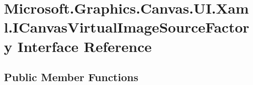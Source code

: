 \hypertarget{interface_microsoft_1_1_graphics_1_1_canvas_1_1_u_i_1_1_xaml_1_1_i_canvas_virtual_image_source_factory}{}\section{Microsoft.\+Graphics.\+Canvas.\+U\+I.\+Xaml.\+I\+Canvas\+Virtual\+Image\+Source\+Factory Interface Reference}
\label{interface_microsoft_1_1_graphics_1_1_canvas_1_1_u_i_1_1_xaml_1_1_i_canvas_virtual_image_source_factory}
\subsection*{Public Member Functions}
